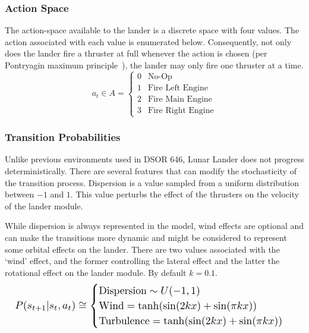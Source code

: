 \documentclass[journal]{IEEEtran}
\begin{document}
\subsubsection{Action Space}
The action-space available to the lander is a discrete space with four values.
The action associated with each value is enumerated below. 
Consequently, not only does the lander fire a thruster at full whenever the action is chosen 
(per Pontryagin maximum principle~\cite{kaufman1964}),
the lander may only fire one thruster at a time.
\[a_t \in A = 
    \begin{cases}
        0 & \text{No-Op} \\
        1 & \text{Fire Left Engine} \\
        2 & \text{Fire Main Engine} \\
        3 & \text{Fire Right Engine}
    \end{cases}
\]

\subsubsection{Transition Probabilities}
Unlike previous environments used in DSOR 646, Lunar Lander does not progress deterministically.
There are several features that can modify the stochasticity of the transition process.
Dispersion is a value sampled from a uniform distribution between \(-1\) and \(1\).
This value perturbs the effect of the thrusters on the velocity of the lander module.

While dispersion is always represented in the model, wind effects are optional and can make the
transitions more dynamic and might be considered to represent some orbital effects on the lander.
There are two values associated with the `wind' effect, 
and  the former controlling the lateral effect and the latter
the rotational effect on the lander module. By default \(k=0.1\).
\begin{equation*}
    \resizebox{\linewidth}{!}{
        \(P(s_{t+1}|s_t,a_t) \cong 
        \begin{cases}
            \text{Dispersion} \sim U(-1,1) \\
            \text{Wind} = \tanh(\sin(2 k x) + \sin(\pi k x)) \\
            \text{Turbulence} = \tanh(\sin(2 k x) + \sin(\pi k x))
        \end{cases}\) 
    }
\end{equation*}
\end{document}
